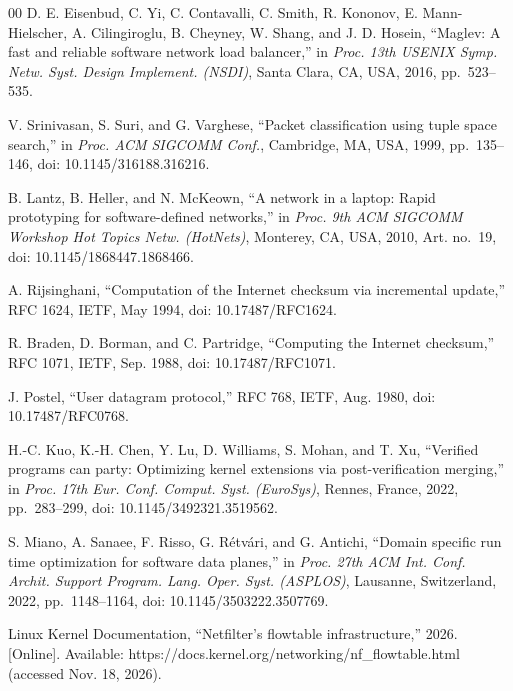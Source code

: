 \documentclass[conference]{IEEEtran}
\begin{document}
\begin{thebibliography}{00}
 D. E. Eisenbud, C. Yi, C. Contavalli, C. Smith,
R. Kononov, E. Mann-Hielscher, A. Cilingiroglu, B. Cheyney, W. Shang, and
J. D. Hosein, ``Maglev: A fast and reliable software network load balancer,''
in \textit{Proc. 13th USENIX Symp. Netw. Syst. Design Implement. (NSDI)},
Santa Clara, CA, USA, 2016, pp.~523--535.

 V. Srinivasan, S. Suri, and G. Varghese, ``Packet
classification using tuple space search,'' in \textit{Proc. ACM SIGCOMM
Conf.}, Cambridge, MA, USA, 1999, pp.~135--146, doi: 10.1145/316188.316216.

 B. Lantz, B. Heller, and N. McKeown, ``A network in
a laptop: Rapid prototyping for software-defined networks,'' in \textit{Proc.
9th ACM SIGCOMM Workshop Hot Topics Netw. (HotNets)}, Monterey, CA, USA, 2010,
Art. no.~19, doi: 10.1145/1868447.1868466.

 A. Rijsinghani, ``Computation of the Internet checksum via
incremental update,'' RFC 1624, IETF, May 1994, doi: 10.17487/RFC1624.

 R. Braden, D. Borman, and C. Partridge, ``Computing the
Internet checksum,'' RFC 1071, IETF, Sep. 1988, doi: 10.17487/RFC1071.

 J. Postel, ``User datagram protocol,'' RFC 768, IETF,
Aug. 1980, doi: 10.17487/RFC0768.

 H.-C. Kuo, K.-H. Chen, Y. Lu, D. Williams, S. Mohan,
and T. Xu, ``Verified programs can party: Optimizing kernel extensions via
post-verification merging,'' in \textit{Proc. 17th Eur. Conf. Comput. Syst.
(EuroSys)}, Rennes, France, 2022, pp.~283--299, doi: 10.1145/3492321.3519562.

 S. Miano, A. Sanaee, F. Risso, G. R\'etv\'ari,
and G. Antichi, ``Domain specific run time optimization for software data
planes,'' in \textit{Proc. 27th ACM Int. Conf. Archit. Support Program.
Lang. Oper. Syst. (ASPLOS)}, Lausanne, Switzerland, 2022, pp.~1148--1164,
doi: 10.1145/3503222.3507769.

 Linux Kernel Documentation, ``Netfilter's flowtable
infrastructure,'' 2026. [Online]. Available:
https://docs.kernel.org/networking/nf\_flowtable.html (accessed Nov. 18, 2026).
\end{thebibliography}
\end{document}
